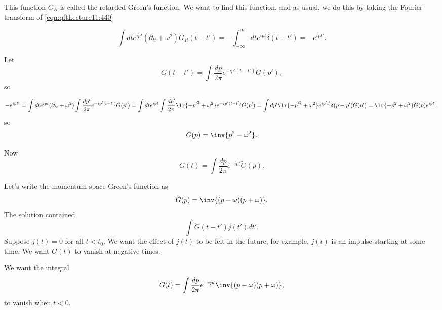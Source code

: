 This function \( G_R \) is called the retarded Green's function.  We want to find this function, and as usual, we do this by taking the Fourier transform of \cref{eqn:qftLecture11:440}

\begin{dmath}\label{eqn:qftLecture11:480}
\int dt e^{i p t}
(\partial_{tt} + \omega^2) G_R(t - t')
=
-\int_{-\infty}^\infty dt e^{i p t}
\delta(t - t')
= - e^{i p t'}.
\end{dmath}

Let
\begin{dmath}\label{eqn:qftLecture11:500}
G(t - t')  = \int \frac{dp }{2 \pi} e^{- i p'(t - t')} \tilde{G}(p'),
\end{dmath}
so

\begin{dmath}\label{eqn:qftLecture11:520}
- e^{i pt'}
=
\int dt e^{i p t}
(\partial_{tt} + \omega^2)
\int \frac{dp'}{2 \pi} e^{- i p'(t - t')} \tilde{G}(p')
=
\int dt e^{i p t} \int
\frac{dp'}{2 \pi} \lr{ -{p'}^2 + \omega^2 } e^{- i p'(t - t')} \tilde{G}(p')
=
\int dp' \lr{ -{p'}^2 + \omega^2 } e^{i p' t'} \delta(p - p') \tilde{G}(p')
=
\lr{ -{p}^2 + \omega^2 } \tilde{G}(p) e^{i p t'},
\end{dmath}
so
\begin{dmath}\label{eqn:qftLecture11:540}
\tilde{G}(p)
= \inv{p^2 - \omega^2}.
\end{dmath}

Now
\begin{dmath}\label{eqn:qftLecture11:560}
G(t)
= \int \frac{dp}{2 \pi} e^{-i p t}
\tilde{G}(p).
\end{dmath}

Let's write the momentum space Green's function as
\begin{dmath}\label{eqn:qftLecture11:580}
\tilde{G}(p)
= \inv{(p - \omega)(p + \omega)}.
\end{dmath}
The solution contained
\begin{dmath}\label{eqn:qftLecture11:600}
\int G(t - t') j(t') dt'.
\end{dmath}
Suppose \( j(t) = 0 \) for all \( t < t_0 \).  We want the effect of \( j(t) \) to be felt in the future, for example, \(j(t) \) is an impulse starting at some time.  We want \( G(t) \) to vanish at negative times.

We want the integral
\begin{dmath}\label{eqn:qftLecture11:620}
G(t)
= \int \frac{dp}{2 \pi} e^{-i p t}
\inv{(p - \omega)(p + \omega)},
\end{dmath}
to vanish when \( t < 0 \).

